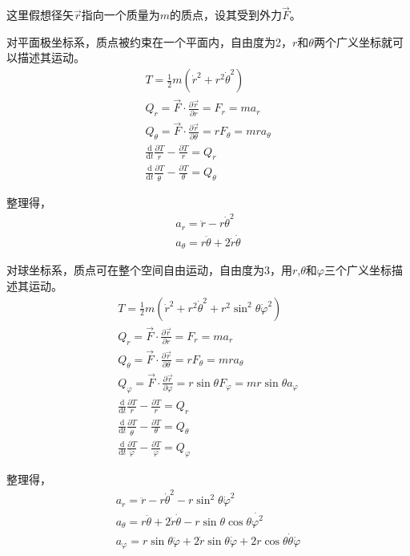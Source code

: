 \documentclass{ctexart}
\begin{document}
    这里假想径矢$\vec{r}$指向一个质量为$m$的质点，设其受到外力$\vec{F}$。

    对平面极坐标系，质点被约束在一个平面内，自由度为2，$r$和$\theta$两个广义坐标就可以描述其运动。
    \begin{gather*}
        T = \frac{1}{2} m (\dot{r}^2+r^2\dot{\theta}^2) \\
        Q_r = \vec{F}\cdot\frac{\partial\vec{r}}{\partial r} = F_r = ma_r \\
        Q_{\theta} = \vec{F}\cdot\frac{\partial\vec{r}}{\partial\theta} = rF_{\theta} = mra_{\theta} \\
        \frac{\mathrm{d}}{\mathrm{d}t}\frac{\partial T}{\dot{r}}-\frac{\partial T}{r} = Q_r \\
        \frac{\mathrm{d}}{\mathrm{d}t}\frac{\partial T}{\dot{\theta}}-
        \frac{\partial T}{\theta} = Q_{\theta}
    \end{gather*}

    整理得，
    \begin{gather*}
        a_r = \ddot{r}-r\dot{\theta}^2 \\
        a_{\theta} = r\ddot{\theta}+2\dot{r}\dot{\theta}
    \end{gather*}

    对球坐标系，质点可在整个空间自由运动，自由度为3，用$r$,$\theta$和$\varphi$三个广义坐标描述其运动。
    \begin{gather*}
        T = \frac{1}{2} m (\dot{r}^2+r^2\dot{\theta}^2+r^2\sin^2\theta\dot{\varphi}^2) \\
        Q_r = \vec{F}\cdot\frac{\partial\vec{r}}{\partial r} = F_r = ma_r \\
        Q_{\theta} = \vec{F}\cdot\frac{\partial\vec{r}}{\partial\theta} = rF_{\theta} = mra_{\theta} \\
        Q_{\varphi} = \vec{F}\cdot\frac{\partial\vec{r}}{\partial\varphi} =
        r\sin\theta F_{\varphi} = mr\sin\theta a_{\varphi} \\
        \frac{\mathrm{d}}{\mathrm{d}t}\frac{\partial T}{\dot{r}}-\frac{\partial T}{r} = Q_r \\
        \frac{\mathrm{d}}{\mathrm{d}t}\frac{\partial T}{\dot{\theta}}-
        \frac{\partial T}{\theta} = Q_{\theta} \\
        \frac{\mathrm{d}}{\mathrm{d}t}\frac{\partial T}{\dot{\varphi}}-
        \frac{\partial T}{\varphi} = Q_{\varphi}
    \end{gather*}

    整理得，
    \begin{gather*}
        a_r = \ddot{r}-r\dot{\theta}^2-r\sin^2\theta\dot{\varphi}^2 \\
        a_{\theta} = r\ddot{\theta}+2\dot{r}\dot{\theta}-r\sin\theta\cos\theta\dot{\varphi^2} \\
        a_{\varphi} = r\sin\theta\ddot{\varphi}+2\dot{r}\sin\theta\dot{\varphi}+
        2r\cos\theta\dot{\theta}\dot{\varphi}
    \end{gather*}
\end{document}
